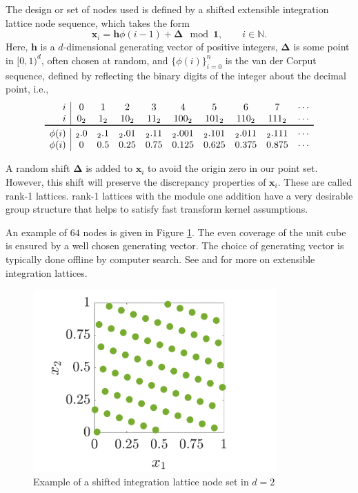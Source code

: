 \documentclass{iitthesis}          %
\newcommand{\bm}[1]{\boldsymbol{#1}}
\newcommand{\naturals}{\mathbb{N}}
\newcommand{\vDelta}{{\boldsymbol{\Delta}}}
\newcommand{\vh}{\bm{h}}
\newcommand{\vx}{\bm{x}}
\newcommand{\vone}{\bm{1}}
\begin{document}

The design or set of nodes used is defined by a shifted extensible integration lattice node sequence, which takes the form
\begin{equation}
\label{eqn:lattice_gen}
\vx_{i} = \vh \phi(i-1) + \vDelta \mod \vone, \qquad i \in \naturals.
\end{equation} 
Here, $\vh$ is a $d$-dimensional generating vector of positive integers, $\vDelta$ is some point in $[0,1)^d$, often chosen at random, and $\{\phi(i)\}_{i=0}^n$ is the van der Corput sequence, defined by reflecting the binary digits of the integer about the decimal point, i.e., 
\begin{equation} \label{vdCDef}
\begin{array}{r|ccccccccccccc}
i & 0 & 1 & 2 & 3 & 4 &  5 & 6 & 7 & \cdots \\
i & 0_2 & 1_2 & 10_2 & 11_2 & 100_2 & 101_2 & 110_2 & 111_2  & \cdots\\
\toprule
\phi(i) & {}_2.0 &  {}_2.1 & {}_2.01 &  {}_2.11  & {}_2.001 &  {}_2.101 & {}_2.011 &  {}_2.111 & \cdots\\
\phi(i) & 0 &  0.5 &  0.25 & 0.75 &  0.125 & 0.625  &  0.375 & 0.875 & \cdots
\end{array}
\end{equation}

A random shift  $\vDelta$ is added to $\vx_{i}$ to avoid the origin zero in our point set. However, this shift will preserve the discrepancy properties of $\vx_{i}$. These are called rank-1 lattices.
rank-1 lattices with the module one addition have a very desirable group structure that helps to satisfy fast transform kernel assumptions.


An example of $64$ nodes is given in Figure  \ref{latticefig}.  The even coverage of the unit cube is ensured by a well chosen generating vector.  The choice of generating vector is typically done offline by computer search.  See \cite{DicEtal14a} and \cite{HicNie03a} for more on extensible integration lattices.
\begin{figure}[htp]
	\centering
	\includegraphics[height=7cm]{ShiftedLatticePoints}
	\caption{Example of a shifted integration lattice node set  in $d=2$ \label{latticefig} }
\end{figure}
\end{document}
